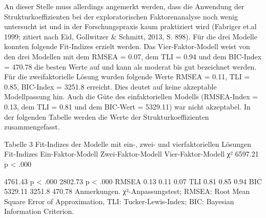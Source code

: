 \documentclass[12pt,a4paper]{article}
\begin{document}
	An dieser Stelle muss allerdings angemerkt werden, dass die Anwendung der Strukturkoeffizienten bei der exploratorischen Faktorenanalyse noch wenig untersucht ist und in der Forschungspraxis kaum praktiziert wird (Fabriger et.al 1999; zitiert nach Eid, Gollwitzer \& Schmitt, 2013, S. 898).
	Für die drei Modelle konnten folgende Fit-Indizes erzielt werden. Das Vier-Faktor-Modell weist von den drei Modellen mit dem RMSEA = 0.07, dem TLI = 0.94 und dem BIC-Index = 470.78 die besten Werte auf und kann als moderat bis gut bezeichnet werden. Für die zweifaktorielle Lösung wurden folgende Werte RMSEA = 0.11, TLI = 0.85, BIC-Index = 3251.8 erreicht. Dies deutet auf keine akzeptable Modellpassung hin. Auch die Güte des einfaktoriellen Modells (RMSEA-Index = 0.13, dem TLI = 0.81 und dem BIC-Wert = 5329.11) war nicht akzeptabel. In der folgenden Tabelle werden die Werte der Strukturkoeffizienten zusammengefasst.

 Tabelle 3
Fit-Indizes der Modelle mit ein-, zwei- und vierfaktoriellen Lösungen
Fit-Indizes
Ein-Faktor-Modell
Zwei-Faktor-Modell
Vier-Faktor-Modell
χ²
             6597.21
     p < .000

   4761.43
    p < .000
    2802.73
     p < .000
RMSEA
0.13
0.11
0.07
TLI
0.81
0.85
0.94
BIC
     5329.11
    3251.8
    470.78
Anmerkungen. χ²-Anpassungstest; RMSEA: Root Mean Square Error of Approximation, TLI: Tucker-Lewis-Index; BIC: Bayesian Information Criterion.
\end{document}
